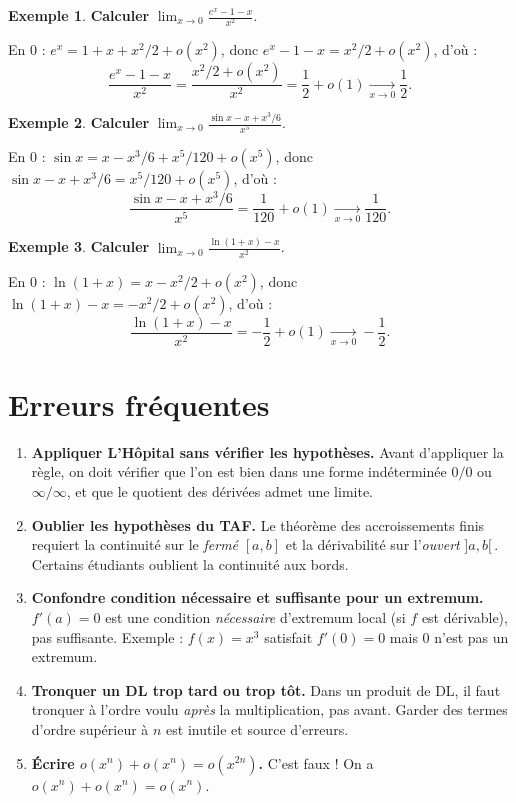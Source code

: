 \documentclass[12pt,a4paper,openany]{book}
\theoremstyle{definition}
\newtheorem{exemple}{Exemple}[chapter]
\begin{document}
\begin{exemple}\label{ex:DL-limite-1}
\textbf{Calculer} $\displaystyle\lim_{x \to 0} \frac{e^x - 1 - x}{x^2}$.

En $0$ : $e^x = 1 + x + x^2/2 + o(x^2)$, donc $e^x - 1 - x = x^2/2 + o(x^2)$, d'où :
\[
  \frac{e^x - 1 - x}{x^2} = \frac{x^2/2 + o(x^2)}{x^2} = \frac{1}{2} + o(1)
  \xrightarrow[x \to 0]{} \frac{1}{2}.
\]
\end{exemple}

\begin{exemple}\label{ex:DL-limite-2}
\textbf{Calculer} $\displaystyle\lim_{x \to 0} \frac{\sin x - x + x^3/6}{x^5}$.

En $0$ : $\sin x = x - x^3/6 + x^5/120 + o(x^5)$, donc $\sin x - x + x^3/6 = x^5/120 + o(x^5)$, d'où :
\[
  \frac{\sin x - x + x^3/6}{x^5} = \frac{1}{120} + o(1)
  \xrightarrow[x \to 0]{} \frac{1}{120}.
\]
\end{exemple}

\begin{exemple}\label{ex:DL-limite-3}
\textbf{Calculer} $\displaystyle\lim_{x \to 0} \frac{\ln(1+x) - x}{x^2}$.

En $0$ : $\ln(1+x) = x - x^2/2 + o(x^2)$, donc $\ln(1+x) - x = -x^2/2 + o(x^2)$, d'où :
\[
  \frac{\ln(1+x) - x}{x^2} = -\frac{1}{2} + o(1)
  \xrightarrow[x \to 0]{} -\frac{1}{2}.
\]
\end{exemple}

\section{Erreurs fréquentes}\label{sec:erreurs-ch6}

\begin{enumerate}[label=\textbf{\arabic*.}]
  \item \textbf{Appliquer L'Hôpital sans vérifier les hypothèses.} Avant d'appliquer la règle, on doit vérifier que l'on est bien dans une forme indéterminée $0/0$ ou $\infty/\infty$, et que le quotient des dérivées admet une limite.

  \item \textbf{Oublier les hypothèses du TAF.} Le théorème des accroissements finis requiert la continuité sur le \emph{fermé} $[a, b]$ et la dérivabilité sur l'\emph{ouvert} $]a, b[\,$. Certains étudiants oublient la continuité aux bords.

  \item \textbf{Confondre condition nécessaire et suffisante pour un extremum.} $f'(a) = 0$ est une condition \emph{nécessaire} d'extremum local (si $f$ est dérivable), pas suffisante. Exemple : $f(x) = x^3$ satisfait $f'(0) = 0$ mais $0$ n'est pas un extremum.

  \item \textbf{Tronquer un DL trop tard ou trop tôt.} Dans un produit de DL, il faut tronquer à l'ordre voulu \emph{après} la multiplication, pas avant. Garder des termes d'ordre supérieur à $n$ est inutile et source d'erreurs.

  \item \textbf{Écrire $o(x^n) + o(x^n) = o(x^{2n})$.} C'est faux ! On a $o(x^n) + o(x^n) = o(x^n)$.
\end{enumerate}
\end{document}
